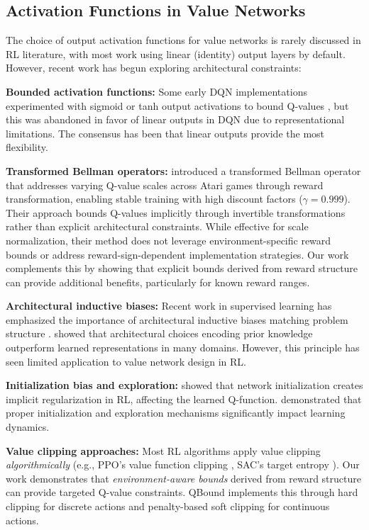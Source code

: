 \documentclass[11pt]{article}
\theoremstyle{definition}
\theoremstyle{remark}
\begin{document}
\subsection{Activation Functions in Value Networks}

The choice of output activation functions for value networks is rarely discussed in RL literature, with most work using linear (identity) output layers by default. However, recent work has begun exploring architectural constraints:

\textbf{Bounded activation functions:} Some early DQN implementations experimented with sigmoid or tanh output activations to bound Q-values \citep{mnih2013playing}, but this was abandoned in favor of linear outputs in DQN \citep{mnih2015human} due to representational limitations. The consensus has been that linear outputs provide the most flexibility.

\textbf{Transformed Bellman operators:} \citet{pohlen2018observe} introduced a transformed Bellman operator that addresses varying Q-value scales across Atari games through reward transformation, enabling stable training with high discount factors ($\gamma = 0.999$). Their approach bounds Q-values implicitly through invertible transformations rather than explicit architectural constraints. While effective for scale normalization, their method does not leverage environment-specific reward bounds or address reward-sign-dependent implementation strategies. Our work complements this by showing that explicit bounds derived from reward structure can provide additional benefits, particularly for known reward ranges.

\textbf{Architectural inductive biases:} Recent work in supervised learning has emphasized the importance of architectural inductive biases matching problem structure \citep{battaglia2018relational}. \citet{goyal2021inductive} showed that architectural choices encoding prior knowledge outperform learned representations in many domains. However, this principle has seen limited application to value network design in RL.

\textbf{Initialization bias and exploration:} \citet{kumar2020implicit} showed that network initialization creates implicit regularization in RL, affecting the learned Q-function. \citet{fortunato2017noisy} demonstrated that proper initialization and exploration mechanisms significantly impact learning dynamics.

\textbf{Value clipping approaches:} Most RL algorithms apply value clipping \textit{algorithmically} (e.g., PPO's value function clipping \citep{schulman2017proximal}, SAC's target entropy \citep{haarnoja2018soft}). Our work demonstrates that \textit{environment-aware bounds} derived from reward structure can provide targeted Q-value constraints. QBound implements this through hard clipping for discrete actions and penalty-based soft clipping for continuous actions.
\end{document}
